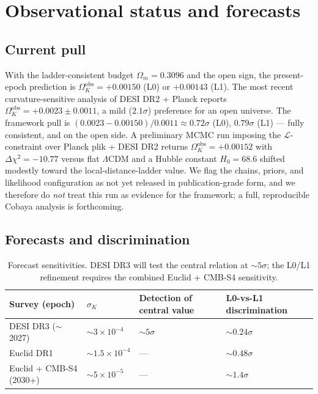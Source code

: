 \documentclass[11pt,a4paper]{article}
\theoremstyle{plain}
\theoremstyle{definition}
\theoremstyle{remark}
\newcommand{\Ok}{\Omega_K}
\newcommand{\Om}{\Omega_m}
\newcommand{\Lb}{\mathcal{L}}
\begin{document}
\section{Observational status and forecasts}
\label{sec:obs}

\subsection{Current pull}
With the ladder-consistent budget $\Om = 0.3096$ and the open sign, the present-epoch prediction is $\Ok^{\mathrm{obs}} =
+0.00150$ (L0) or $+0.00143$ (L1). The most recent curvature-sensitive analysis of DESI DR2 +
Planck \cite{ChenZaldarriaga2025} reports $\Ok^{\mathrm{obs}} = +0.0023 \pm 0.0011$, a mild
($2.1\sigma$) preference for an open universe. The framework pull is
$(0.0023-0.00150)/0.0011 \approx 0.72\sigma$ (L0), $0.79\sigma$ (L1) --- fully consistent, and
on the open side. A preliminary MCMC run imposing the $\Lb$-constraint over Planck plik + DESI
DR2 returns $\Ok^{\mathrm{obs}} = +0.00152$ with $\Delta\chi^2 = -10.77$ versus flat
$\Lambda$CDM and a Hubble constant $H_0 = 68.6$ shifted modestly toward the local-distance-ladder
value. We flag the chains, priors, and likelihood configuration as not yet released in
publication-grade form, and we therefore do \emph{not} treat this run as evidence for the
framework; a full, reproducible Cobaya analysis is forthcoming.

\subsection{Forecasts and discrimination}
\begin{table}[h]
\centering
\renewcommand{\arraystretch}{1.3}
\begin{tabular}{@{}l l l l@{}}
\toprule
Survey (epoch) & $\sigma_K$ & Detection of central value & L0-vs-L1 discrimination \\
\midrule
DESI DR3 ($\sim$2027) & $\sim 3\times 10^{-4}$ & $\sim 5\sigma$ & $\sim 0.24\sigma$ \\
Euclid DR1 & $\sim 1.5\times 10^{-4}$ & --- & $\sim 0.48\sigma$ \\
Euclid + CMB-S4 (2030+) & $\sim 5\times 10^{-5}$ & --- & $\sim 1.4\sigma$ \\
\bottomrule
\end{tabular}
\caption{Forecast sensitivities. DESI DR3 will test the central relation at $\sim 5\sigma$; the
L0/L1 refinement requires the combined Euclid + CMB-S4 sensitivity.}
\label{tab:forecast}
\end{table}
\end{document}
